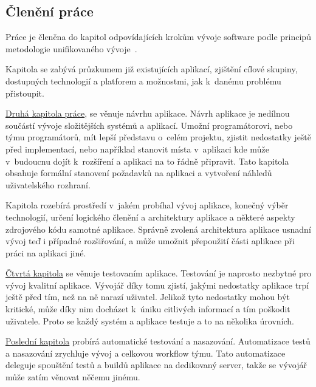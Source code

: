 \begin{introduction}
    \section{Členění práce}
    Práce je členěna do kapitol odpovídajících krokům vývoje software podle principů metodologie unifikovaného vývoje~\cite[s.~51‑68]{arlow_2007_uml}.

    Kapitola  se zabývá průzkumem již existujících aplikací, zjištění cílové skupiny, dostupných technologií a platforem a možnostmi, jak k~danému problému přistoupit.

    \hyperref[ch:design]{Druhá kapitola práce}, se věnuje návrhu aplikace. Návrh aplikace je nedílnou součástí vývoje složitějších systémů a aplikací. Umožní programátorovi, nebo týmu programátorů, mít lepší představu o~celém projektu, zjistit nedostatky ještě před implementací, nebo například stanovit místa v~aplikaci kde může v~budoucnu dojít k~rozšíření a aplikaci na to řádně připravit. Tato kapitola obsahuje formální stanovení požadavků na aplikaci a vytvoření náhledů uživatelského rozhraní.

    Kapitola  rozebírá prostředí v~jakém probíhal vývoj aplikace, konečný výběr technologií, určení logického členění a architektury aplikace a některé aspekty zdrojového kódu samotné aplikace. Správně zvolená architektura aplikace usnadní vývoj teď i případné rozšiřování, a může umožnit přepoužití části aplikace při práci na aplikaci jiné.

    \hyperref[ch:testing]{Čtvrtá kapitola} se věnuje testovaním aplikace. Testování je naprosto nezbytné pro vývoj kvalitní aplikace. Vývojář díky tomu zjistí, jakými nedostatky aplikace trpí ještě před tím, než na ně narazí uživatel. Jelikož tyto nedostatky mohou být kritické, může díky nim docházet k~úniku citlivých informací a tím poškodit uživatele. Proto se každý systém a aplikace testuje a to na několika úrovních.

    \hyperref[ch:ci_cd]{Poslední kapitola} probírá automatické testování a nasazování. Automatizace testů a nasazování zrychluje vývoj a celkovou workflow týmu. Tato automatizace deleguje spouštění testů a buildů aplikace na dedikovaný server, takže se vývojář může zatím věnovat něčemu jinému.
\end{introduction}